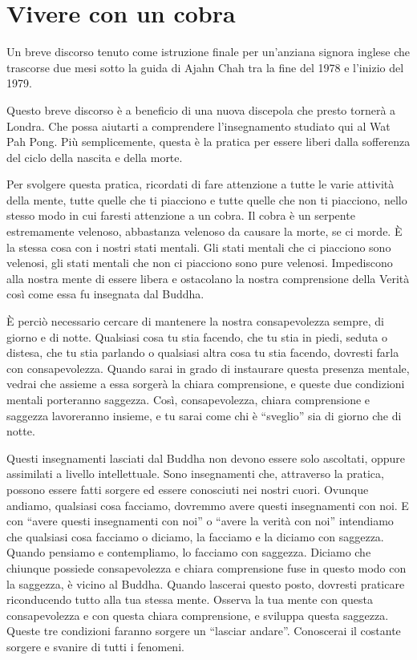 \chapter{Vivere con un cobra}

\begin{openingQuote}
  Un breve discorso tenuto come istruzione finale per un'anziana signora inglese
  che trascorse due mesi sotto la guida di Ajahn Chah tra la fine del 1978 e
  l'inizio del 1979.
\end{openingQuote}

Questo breve discorso è a beneficio di una nuova discepola che presto
tornerà a Londra. Che possa aiutarti a comprendere l'insegnamento
studiato qui al Wat Pah Pong. Più semplicemente, questa è la pratica per
essere liberi dalla sofferenza del ciclo della nascita e della morte.

Per svolgere questa pratica, ricordati di fare attenzione a tutte le
varie attività della mente, tutte quelle che ti piacciono e tutte quelle
che non ti piacciono, nello stesso modo in cui faresti attenzione a un
cobra. Il cobra è un serpente estremamente velenoso, abbastanza velenoso
da causare la morte, se ci morde. È la stessa cosa con i nostri stati
mentali. Gli stati mentali che ci piacciono sono velenosi, gli stati
mentali che non ci piacciono sono pure velenosi. Impediscono alla nostra
mente di essere libera e ostacolano la nostra comprensione della Verità
così come essa fu insegnata dal Buddha.

È perciò necessario cercare di mantenere la nostra consapevolezza
sempre, di giorno e di notte. Qualsiasi cosa tu stia facendo, che tu
stia in piedi, seduta o distesa, che tu stia parlando o qualsiasi altra
cosa tu stia facendo, dovresti farla con consapevolezza. Quando sarai in
grado di instaurare questa presenza mentale, vedrai che assieme a essa
sorgerà la chiara comprensione, e queste due condizioni mentali
porteranno saggezza. Così, consapevolezza, chiara comprensione e
saggezza lavoreranno insieme, e tu sarai come chi è ``sveglio'' sia di
giorno che di notte.

Questi insegnamenti lasciati dal Buddha non devono essere solo
ascoltati, oppure assimilati a livello intellettuale. Sono insegnamenti
che, attraverso la pratica, possono essere fatti sorgere ed essere
conosciuti nei nostri cuori. Ovunque andiamo, qualsiasi cosa facciamo,
dovremmo avere questi insegnamenti con noi. E con ``avere questi
insegnamenti con noi'' o ``avere la verità con noi'' intendiamo che
qualsiasi cosa facciamo o diciamo, la facciamo e la diciamo con
saggezza. Quando pensiamo e contempliamo, lo facciamo con saggezza.
Diciamo che chiunque possiede consapevolezza e chiara comprensione fuse
in questo modo con la saggezza, è vicino al Buddha. Quando lascerai
questo posto, dovresti praticare riconducendo tutto alla tua stessa
mente. Osserva la tua mente con questa consapevolezza e con questa
chiara comprensione, e sviluppa questa saggezza. Queste tre condizioni
faranno sorgere un ``lasciar andare''. Conoscerai il costante sorgere e
svanire di tutti i fenomeni.

